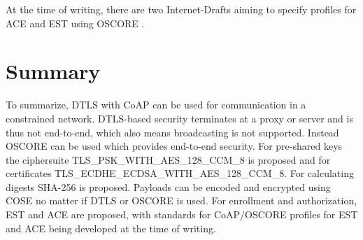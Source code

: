 \documentclass[0-thesis.tex]{subfiles}
\begin{document}
At the time of writing, there are two Internet-Drafts aiming to specify profiles for ACE
and EST using OSCORE \parencite{ace-oscore, est-oscore}.

\section{Summary}
To summarize, DTLS with CoAP can be used for communication in a constrained network.
DTLS-based security terminates at a proxy or server and is thus not end-to-end, which also
means broadcasting is not supported. Instead OSCORE can be used which provides end-to-end
security. For pre-shared keys the ciphersuite TLS\_PSK\_WITH\_AES\_128\_CCM\_8{} is
proposed and for certificates TLS\_ECDHE\_ECDSA\_WITH\_AES\_128\_CCM\_8{}. For calculating
digests SHA-256 is proposed. Payloads can be encoded and encrypted using COSE no matter if
DTLS or OSCORE is used. For enrollment and authorization, EST and ACE are proposed, with
standards for CoAP/OSCORE profiles for EST and ACE  being developed at the time of
writing.
\end{document}

